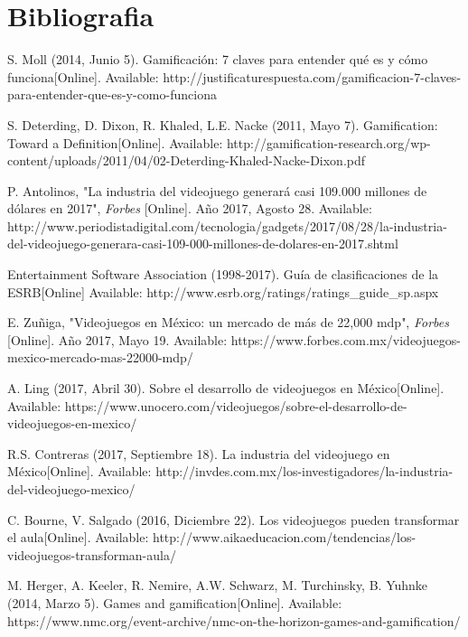 \chapter{Bibliografia}	

\begin{thebibliography}{X}
	
	
	\textnormal S. Moll (2014, Junio 5). Gamificación: 7 claves para entender qué es y cómo funciona[Online]. Available: http://justificaturespuesta.com/gamificacion-7-claves-para-entender-que-es-y-como-funciona
	
	\textnormal S. Deterding, D. Dixon, R. Khaled, L.E. Nacke (2011, Mayo 7). Gamification: Toward a Definition[Online]. Available: http://gamification-research.org/wp-content/uploads/2011/04/02-Deterding-Khaled-Nacke-Dixon.pdf

	\textnormal P. Antolinos, "La industria del videojuego generará casi 109.000 millones de dólares en 2017", \textit{Forbes} [Online]. Año 2017, Agosto 28. Available: http://www.periodistadigital.com/tecnologia/gadgets/2017/08/28/la-industria-del-videojuego-generara-casi-109-000-millones-de-dolares-en-2017.shtml
	
	\textnormal Entertainment Software Association (1998-2017). Guía de clasificaciones de la ESRB[Online] Available: http://www.esrb.org/ratings/ratings\_guide\_sp.aspx
		
	\textnormal E. Zuñiga, "Videojuegos en México: un mercado de más de 22,000 mdp", \textit{Forbes} [Online]. Año 2017, Mayo 19. Available: https://www.forbes.com.mx/videojuegos-mexico-mercado-mas-22000-mdp/
	
	\textnormal A. Ling (2017, Abril 30). Sobre el desarrollo de videojuegos en México[Online]. Available: https://www.unocero.com/videojuegos/sobre-el-desarrollo-de-videojuegos-en-mexico/
	
	
	\textnormal R.S. Contreras (2017, Septiembre 18). La industria del videojuego en México[Online]. Available: http://invdes.com.mx/los-investigadores/la-industria-del-videojuego-mexico/
	
	\textnormal C. Bourne, V. Salgado (2016, Diciembre 22). Los videojuegos pueden transformar el aula[Online]. Available: http://www.aikaeducacion.com/tendencias/los-videojuegos-transforman-aula/
	
	\textnormal M. Herger, A. Keeler, R. Nemire, A.W. Schwarz, M. Turchinsky, B. Yuhnke (2014, Marzo 5). Games and gamification[Online]. Available: https://www.nmc.org/event-archive/nmc-on-the-horizon-games-and-gamification/
	

\end{thebibliography}
